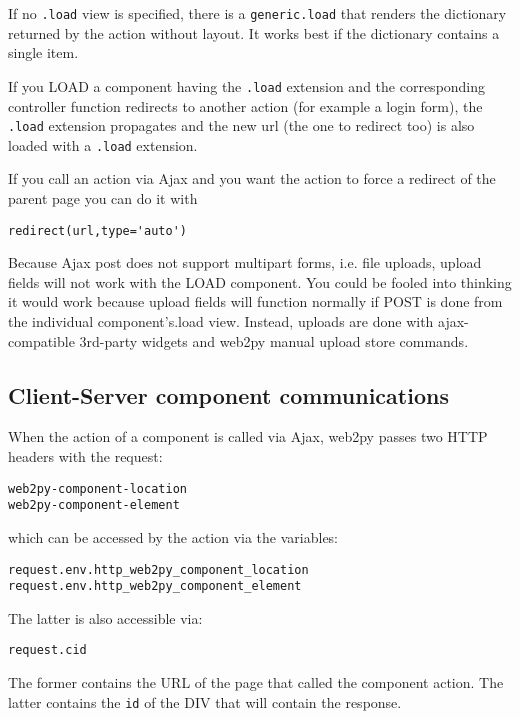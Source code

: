 \documentclass[justified,sixbynine,notoc]{tufte-book}
\def\ft{\small\tt}
\def\inxx#1{\index{#1}}
\begin{document}
\begin{fullwidth}
If no {\ft .load} view is specified, there is a {\ft generic.load} that renders the dictionary returned by the action without layout. It works best if the dictionary contains a single item.

If you LOAD a component having the {\ft .load} extension and the corresponding controller function redirects to another action (for example a login form), the {\ft .load} extension propagates and the new url (the one to redirect too) is also loaded with a {\ft .load} extension.

If you call an action via Ajax and you want the action to force a redirect of the parent page you can do it with

\begin{lstlisting}
redirect(url,type='auto')
\end{lstlisting}

Because Ajax post does not support multipart forms, i.e. file uploads, upload fields will not work with the LOAD component. You could be fooled into thinking it would work because upload fields will function normally if POST is done from the individual component's.load view. Instead, uploads are done with ajax-compatible 3rd-party widgets and web2py manual upload store commands.

\goodbreak\subsection{Client-Server component communications}

When the action of a component is called via Ajax, web2py passes two HTTP headers with the request:

\begin{lstlisting}
web2py-component-location
web2py-component-element
\end{lstlisting}
\noindent which can be accessed by the action via the variables:

\begin{lstlisting}
request.env.http_web2py_component_location
request.env.http_web2py_component_element
\end{lstlisting}

The latter is also accessible via: \inxx{request.cid}

\begin{lstlisting}
request.cid
\end{lstlisting}

The former contains the URL of the page that called the component action.
The latter contains the {\ft id} of the DIV that will contain the response.


\end{fullwidth}
\end{document}
